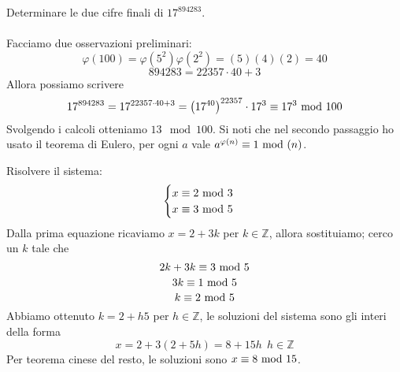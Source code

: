 \begin{esercizio}
	Determinare le due cifre finali di $17^{894283}$. \\ \\ Facciamo due osservazioni preliminari:
	\begin{equation*}
	\varphi(100)=\varphi(5^2)\varphi(2^2)=(5)(4)(2)=40
	\end{equation*}
	\begin{equation*}
	894283=22357\cdot40+3
	\end{equation*}
	Allora possiamo scrivere
	\begin{equation*}
	17^{894283}=17^{22357\cdot40+3}=\left(17^{40}\right)^{22357}\cdot17^3\equiv17^3\ \mathrm{mod}\ 100
	\end{equation*}
	Svolgendo i calcoli otteniamo $13\mod100$. Si noti che nel secondo passaggio ho usato il teorema di Eulero, per ogni $a$ vale $a^{\varphi(n)}\equiv1\ \mathrm{mod}\ (n)$.
\end{esercizio}
\begin{esercizio} Risolvere il sistema:
	\begin{equation*}
	\begin{cases}
	x\equiv2\ \mathrm{mod}\ 3\\ x\equiv3\ \mathrm{mod}\ 5
	\end{cases}
	\end{equation*}
	Dalla prima equazione ricaviamo $x=2+3k$ per $k\in\mathbb{Z}$, allora sostituiamo; cerco un $k$ tale che 
	\begin{equation*}
	2k+3k\equiv3\ \mathrm{mod}\ 5
	\end{equation*}
	\begin{equation*}
	3k\equiv1\ \mathrm{mod}\ 5
	\end{equation*}
	\begin{equation*}
	k\equiv2\ \mathrm{mod}\ 5
	\end{equation*}
	Abbiamo ottenuto $k=2+h5$ per $h\in\mathbb{Z}$, le soluzioni del sistema sono gli interi della forma
	\begin{equation*}
	x=2+3(2+5h)=8+15h \ \ h\in\mathbb{Z}
	\end{equation*}
	Per teorema cinese del resto, le soluzioni sono $x\equiv8\ \mathrm{mod}\ 15$.
\end{esercizio}
